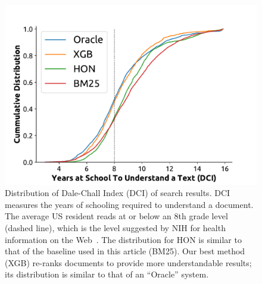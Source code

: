 \begin{figure}[t!]
   \centering
   \includegraphics[width=.51\textwidth]{graphics/cumdist}
    \caption{Distribution of Dale-Chall Index (DCI) of search results. DCI measures the years of schooling required to understand a document. The average US resident reads at or below an 8th grade level (dashed line)\cite{cowan04,wallace04,davis04,stossel12}, which is the level suggested by NIH for health information on the Web~\cite{clear94}. The distribution for HON is similar to that of the baseline used in this article (BM25). Our best method (XGB) re-ranks documents to provide more understandable results; its distribution is similar to that of an ``Oracle'' system.}
   \label{fig:dist}
\end{figure}


